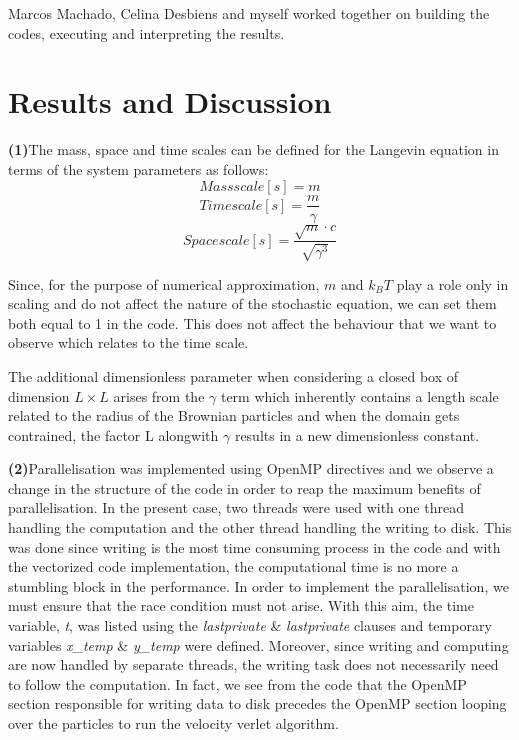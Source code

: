 \documentclass[11pt, oneside]{article}
\begin{document}
Marcos Machado, Celina Desbiens and myself worked together on building the codes, executing and interpreting the results. 
	
\section{Results and Discussion}
\textbf{(1)}\quad The mass, space and time scales can be defined for the  Langevin equation in terms of the system parameters as follows: \[Mass scale [s] = m\]  \[Time scale [s] = \frac{m}{\gamma}\]  \[Space scale [s] = \frac{\sqrt{m}\cdot c}{\sqrt{\gamma^3}}\]

Since, for the purpose of numerical approximation, \(m\) and \(k_B T\) play a role only in scaling and do not affect the nature of the stochastic equation, we can set them both equal to 1 in the code. This does not affect the behaviour that we want to observe which relates to the time scale.

The additional dimensionless parameter when considering a closed box of dimension \(L \times L\) arises from the \(\gamma\) term which inherently contains a length scale related to the radius of the Brownian particles and when the domain gets contrained, the factor L alongwith \(\gamma\) results in a new dimensionless constant.


\textbf{(2)}\quad Parallelisation was implemented using OpenMP directives and we observe a change in the structure of the code in order to reap the maximum benefits of parallelisation. In the present case, two threads were used with one thread handling the computation and the other thread handling the writing to disk. This was done since writing is the most time consuming process in the code and with the vectorized code implementation, the computational time is no more a stumbling block in the performance. In order to implement the  parallelisation, we must ensure that the race condition must not arise. With this aim, the time variable, \textit{t}, was listed using the \textit{lastprivate} \& \textit{lastprivate} clauses and temporary variables \textit{x\_temp} \& \textit{y\_temp} were defined. Moreover, since writing and computing are now handled by separate threads, the writing task does not necessarily need to follow the computation. In fact, we see from the code that the OpenMP section responsible for writing data to disk precedes the OpenMP section looping over the particles to run the velocity verlet algorithm.
\end{document}
